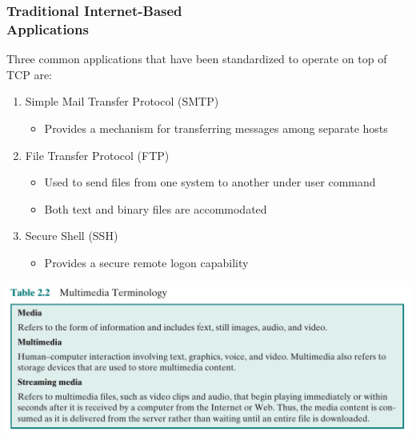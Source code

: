 \documentclass[pdflatex,compress]{beamer}
\begin{document}
\begin{frame}
	\frametitle{Traditional Internet-Based\\Applications}
	Three common applications that have been standardized to operate on top of TCP are:
	\begin{enumerate}
		\item Simple Mail Transfer Protocol (SMTP)
		\begin{itemize}
			\item Provides a mechanism for transferring messages among separate hosts
		\end{itemize}
		\item File Transfer Protocol (FTP)
		\begin{itemize}
			\item Used to send files from one system to another under user command
			\item Both text and binary files are accommodated
		\end{itemize}
		\item Secure Shell (SSH)
		\begin{itemize}
			\item Provides a secure remote logon capability
		\end{itemize}
	\end{enumerate}
\end{frame}

\begin{frame}
	\begin{center}
		\includegraphics[width=\linewidth]{img/img13}
	\end{center}
\end{frame}
\end{document}
